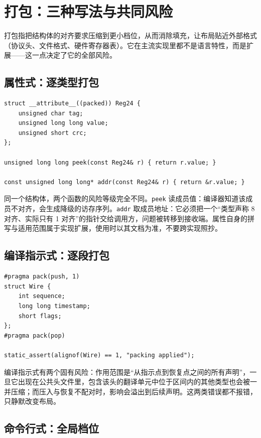 \documentclass[12pt,a4paper,fontset=fandol]{ctexbook}
\newcommand{\Feat}[1]{\texttt{#1}}
\begin{document}
\section{打包：三种写法与共同风险}\label{sec:ub07-packing}

打包指把结构体的对齐要求压缩到更小档位，从而消除填充，让布局贴近外部格式（协议头、文件格式、硬件寄存器表）。它在主流实现里都不是语言特性，而是扩展——这一点决定了它的全部风险。

\subsection{属性式：逐类型打包}\label{sec:ub07-packed-attr}

\begin{lstlisting}[style=cppstyle,caption={属性式打包只对声明了该属性的类型生效}]
struct __attribute__((packed)) Reg24 {
    unsigned char tag;
    unsigned long long value;
    unsigned short crc;
};

unsigned long long peek(const Reg24& r) { return r.value; }

const unsigned long long* addr(const Reg24& r) { return &r.value; }
\end{lstlisting}

同一个结构体，两个函数的风险等级完全不同。\Feat{peek} 读成员值：编译器知道该成员不对齐，会生成降级的访存序列。\Feat{addr} 取成员地址：它必须把一个“类型声称 8 对齐、实际只有 1 对齐”的指针交给调用方，问题被转移到接收端。属性自身的拼写与适用范围属于实现扩展，使用时以其文档为准，不要跨实现照抄。

\subsection{编译指示式：逐段打包}\label{sec:ub07-pragma-pack}

\begin{lstlisting}[style=cppstyle,caption={编译指示式的作用范围由成对的恢复指示决定}]
#pragma pack(push, 1)
struct Wire {
    int sequence;
    long long timestamp;
    short flags;
};
#pragma pack(pop)

static_assert(alignof(Wire) == 1, "packing applied");
\end{lstlisting}

编译指示式有两个固有风险：作用范围是“从指示点到恢复点之间的所有声明”，一旦它出现在公共头文件里，包含该头的翻译单元中位于区间内的其他类型也会被一并压缩；而压入与恢复不配对时，影响会溢出到后续声明。这两类错误都不报错，只静默改变布局。

\subsection{命令行式：全局档位}\label{sec:ub07-cli-pack}
\end{document}
